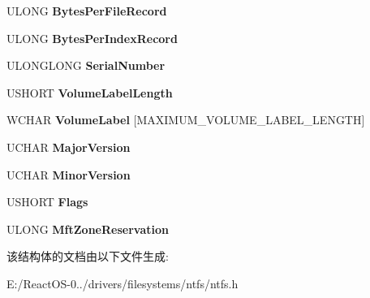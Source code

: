 \begin{DoxyCompactItemize}
U\+L\+O\+NG {\bfseries Bytes\+Per\+File\+Record}
\item 
\mbox{\label{struct___n_t_f_s___i_n_f_o_a5214714bb7623509ab679f9517957927}} 
U\+L\+O\+NG {\bfseries Bytes\+Per\+Index\+Record}
\item 
\mbox{\label{struct___n_t_f_s___i_n_f_o_aba0ea92fcc0b420022fc7dfe69dcc6ec}} 
U\+L\+O\+N\+G\+L\+O\+NG {\bfseries Serial\+Number}
\item 
\mbox{\label{struct___n_t_f_s___i_n_f_o_a29594bb15f15214643df9133e13fd14b}} 
U\+S\+H\+O\+RT {\bfseries Volume\+Label\+Length}
\item 
\mbox{\label{struct___n_t_f_s___i_n_f_o_a38abe96268d535480a6db6dbf281f7e1}} 
W\+C\+H\+AR {\bfseries Volume\+Label} \mbox{[}M\+A\+X\+I\+M\+U\+M\+\_\+\+V\+O\+L\+U\+M\+E\+\_\+\+L\+A\+B\+E\+L\+\_\+\+L\+E\+N\+G\+TH\mbox{]}
\item 
\mbox{\label{struct___n_t_f_s___i_n_f_o_af05af533ab2131324a3f58b37ee7226c}} 
U\+C\+H\+AR {\bfseries Major\+Version}
\item 
\mbox{\label{struct___n_t_f_s___i_n_f_o_a96d599b0eb334b62bdee359cee5bbe33}} 
U\+C\+H\+AR {\bfseries Minor\+Version}
\item 
\mbox{\label{struct___n_t_f_s___i_n_f_o_a5864076a4ecd1a9916ed667e8d9c6b4b}} 
U\+S\+H\+O\+RT {\bfseries Flags}
\item 
\mbox{\label{struct___n_t_f_s___i_n_f_o_abe78be6ded10effd161439e28e163131}} 
U\+L\+O\+NG {\bfseries Mft\+Zone\+Reservation}
\end{DoxyCompactItemize}


该结构体的文档由以下文件生成\+:\begin{DoxyCompactItemize}
\item 
E\+:/\+React\+O\+S-\/0../drivers/filesystems/ntfs/ntfs.\+h\end{DoxyCompactItemize}

